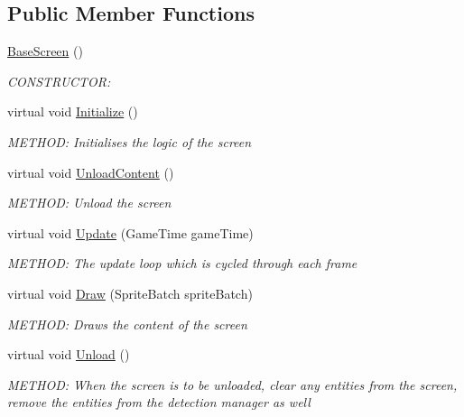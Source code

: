\subsection*{Public Member Functions}
\begin{DoxyCompactItemize}
\item 
\hyperlink{a00550_af66e62ec831d9ac03c231265b808417f}{Base\+Screen} ()
\begin{DoxyCompactList}\small\item\em C\+O\+N\+S\+T\+R\+U\+C\+T\+OR\+: \end{DoxyCompactList}\item 
virtual void \hyperlink{a00550_af8fd6890abf865641e190578ef2e054c}{Initialize} ()
\begin{DoxyCompactList}\small\item\em M\+E\+T\+H\+OD\+: Initialises the logic of the screen \end{DoxyCompactList}\item 
virtual void \hyperlink{a00550_abd2118fc928f9057ddacbe758b80fe68}{Unload\+Content} ()
\begin{DoxyCompactList}\small\item\em M\+E\+T\+H\+OD\+: Unload the screen \end{DoxyCompactList}\item 
virtual void \hyperlink{a00550_a098ece7d1e112475f6e880c3a672af64}{Update} (Game\+Time game\+Time)
\begin{DoxyCompactList}\small\item\em M\+E\+T\+H\+OD\+: The update loop which is cycled through each frame \end{DoxyCompactList}\item 
virtual void \hyperlink{a00550_a200c31954effe5fc060118607155fb16}{Draw} (Sprite\+Batch sprite\+Batch)
\begin{DoxyCompactList}\small\item\em M\+E\+T\+H\+OD\+: Draws the content of the screen \end{DoxyCompactList}\item 
virtual void \hyperlink{a00550_a861ab6364e68e3e3b6b9718e34ba18a2}{Unload} ()
\begin{DoxyCompactList}\small\item\em M\+E\+T\+H\+OD\+: When the screen is to be unloaded, clear any entities from the screen, remove the entities from the detection manager as well \end{DoxyCompactList}\end{DoxyCompactItemize}
